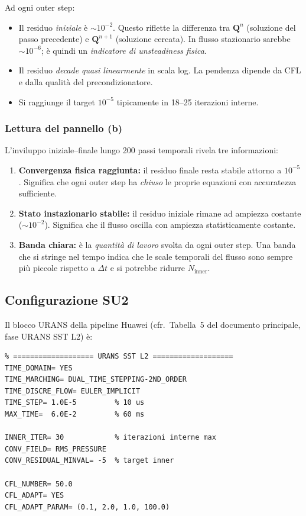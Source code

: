 \documentclass[11pt,a4paper]{article}
\begin{document}
Ad ogni outer step:
\begin{itemize}
  \item Il residuo \emph{iniziale} è $\sim 10^{-2}$. Questo riflette la
    differenza tra $\mathbf{Q}^n$ (soluzione del passo precedente) e
    $\mathbf{Q}^{n+1}$ (soluzione cercata). In flusso stazionario sarebbe
    $\sim 10^{-6}$; è quindi un \emph{indicatore di unsteadiness fisica}.
  \item Il residuo \emph{decade quasi linearmente} in scala log. La
    pendenza dipende da CFL e dalla qualità del precondizionatore.
  \item Si raggiunge il target $10^{-5}$ tipicamente in 18--25
    iterazioni interne.
\end{itemize}

\subsubsection*{Lettura del pannello (b)}

L'inviluppo iniziale--finale lungo 200 passi temporali rivela tre
informazioni:
\begin{enumerate}
  \item \textbf{Convergenza fisica raggiunta:} il residuo finale resta
    stabile attorno a $10^{-5}$. Significa che ogni outer step ha
    \emph{chiuso} le proprie equazioni con accuratezza sufficiente.
  \item \textbf{Stato instazionario stabile:} il residuo iniziale
    rimane ad ampiezza costante ($\sim 10^{-2}$). Significa che il
    flusso oscilla con ampiezza statisticamente costante.
  \item \textbf{Banda chiara:} è la \emph{quantità di lavoro} svolta
    da ogni outer step. Una banda che si stringe nel tempo indica che
    le scale temporali del flusso sono sempre più piccole rispetto a
    $\Delta t$ e si potrebbe ridurre $N_{\mathrm{inner}}$.
\end{enumerate}

\subsection{Configurazione SU2}

Il blocco URANS della pipeline Huawei (cfr.\ Tabella~5 del documento
principale, fase URANS SST L2) è:

\begin{lstlisting}
% =================== URANS SST L2 ===================
TIME_DOMAIN= YES
TIME_MARCHING= DUAL_TIME_STEPPING-2ND_ORDER
TIME_DISCRE_FLOW= EULER_IMPLICIT
TIME_STEP= 1.0E-5         % 10 us
MAX_TIME=  6.0E-2         % 60 ms

INNER_ITER= 30            % iterazioni interne max
CONV_FIELD= RMS_PRESSURE
CONV_RESIDUAL_MINVAL= -5  % target inner

CFL_NUMBER= 50.0
CFL_ADAPT= YES
CFL_ADAPT_PARAM= (0.1, 2.0, 1.0, 100.0)
\end{lstlisting}
\end{document}
